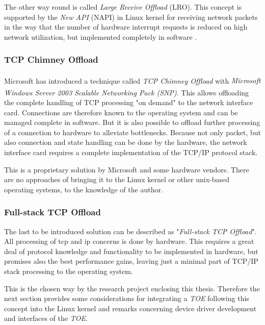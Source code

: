 The other way round is called \textit{Large Receive Offload} (LRO). This concept is supported by the \textit{New API} (NAPI) in Linux kernel for receiving network packets in the way that the number of hardware interrupt requests is reduced on high network utilization, but implemented completely in software \cite{linux-lro}.
\\

\subsubsection{TCP Chimney Offload}

Microsoft has introduced a technique called \textit{TCP Chimney Offload} with \textit{Microsoft\textsuperscript{\textregistered} Windows Server\textsuperscript{\textregistered} 2003 Scalable Networking Pack (SNP)}. This allows offloading the complete handling of TCP processing "on demand" to the network interface card. Connections are therefore known to the operating system and can be managed complete in software. But it is also possible to offload further processing of a connection to hardware to alleviate bottlenecks. Because not only packet, but also connection and state handling can be done by the hardware, the network interface card requires a complete implementation of the TCP/IP protocol stack. \cite{dell-toe}

This is a proprietary solution by Microsoft and some hardware vendors. There are no approaches of bringing it to the Linux kernel or other unix-based operating systems, to the knowledge of the author.
\\

\subsubsection{Full-stack TCP Offload}

The last to be introduced solution can be described as "\textit{Full-stack TCP Offload}". All processing of \gls{tcp} and \gls{ip} concerns is done by hardware. This requires a great deal of protocol knowledge and functionality to be implemented in hardware, but promises also the best performance gains, leaving just a minimal part of TCP/IP stack processing to the operating system.

This is the chosen way by the research project enclosing this thesis. Therefore the next section provides some considerations for integrating a \textit{TOE} following this concept into the Linux kernel and remarks concerning device driver development and interfaces of the \textit{TOE}.
\\

